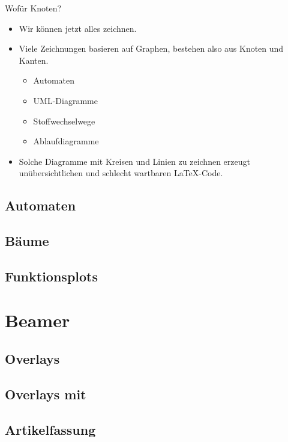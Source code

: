 \documentclass[xcolor=table]{beamer}
\begin{document}
\begin{frame}{Wofür Knoten?}
  \begin{itemize}
    \item \alert{Wir können jetzt alles zeichnen.}
    \item Viele Zeichnungen basieren auf Graphen,
      bestehen also aus Knoten und Kanten.
      \begin{itemize}
        \item Automaten
        \item UML-Diagramme
        \item Stoffwechselwege
        \item Ablaufdiagramme
      \end{itemize}
    \item Solche Diagramme mit Kreisen und Linien zu zeichnen erzeugt
      \alert{unübersichtlichen und schlecht wartbaren} \LaTeX-Code.
  \end{itemize}
\end{frame}


\subsection{Automaten}

\subsection{Bäume}

\subsection{Funktionsplots}

\section{Beamer}





\subsection{Overlays}

\subsection{Overlays mit \TikZ}

\subsection{Artikelfassung}




\end{document}
